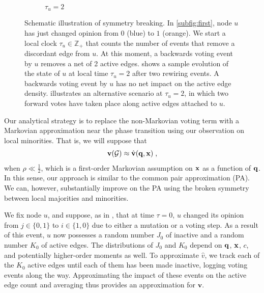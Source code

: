 \documentclass[review, onefignum, onetabnum]{siamart171218}
\begin{document}
\begin{figure}
\begin{subfigure}{.3\textwidth}
				\caption{$\tau_u = 2$}\label{subfig:third}
			\end{subfigure}
			\caption{
				Schematic illustration of symmetry breaking.
				In \cref{subfig:first},  node $u$ has just changed opinion from $0$ (blue) to $1$ (orange). 
				We start a local clock $\tau_u \in \mathbb{Z}_+$ that counts the number of events that remove a discordant edge from $u$. 
				At this moment, a backwards voting event by $u$ removes a net of 2 active edges.  
				 shows a sample evolution of the state of $u$ at local time $\tau_u = 2$ after two rewiring events. 
				A backwards voting event by $u$ has no net impact on the active edge density. 
				 illustrates an alternative scenario at $\tau_u = 2$, in which two forward votes have taken place along active edges attached to $u$. 
				}\label{fig:breaking_illustration}
		\end{figure}
	
		Our analytical strategy is to replace the non-Markovian voting term with a Markovian approximation near the phase transition using our observation on local minorities. 
		That is, we will suppose that 
		\begin{align}
			\mathbf{v}(\mathcal{G}) \approx \hat{\mathbf{v}}(\q, \x)\;, \label{eq:markov}
		\end{align}
		when $\rho \ll \frac{1}{2}$, which is a first-order Markovian assumption on $\mathbf{x}$ as a function of $\mathbf{q}$. 
		In this sense, our approach is similar to the common pair approximation (PA). 
		We can, however, substantially improve on the PA using the broken symmetry between local majorities and minorities. 

		We fix node $u$, and suppose, as in , that at time $\tau = 0$, $u$ changed its opinion from $j \in \{0,1\}$ to $i \in \{1,0\}$ due to either a mutation or a voting step. 
		As a result of this event, $u$ now possesses a  random number $J_0$ of inactive and a random number $K_0$ of active edges. 
		The distributions of $J_0$ and $K_0$ depend on $\mathbf{q}$, $\mathbf{x}$, $c$, and potentially higher-order moments as well. 
		To approximate $\hat{v}$, we track each of the $K_0$ active edges until each of them has been made inactive, logging voting events along the way.
		Approximating the impact of these events on the active edge count and averaging thus provides an  approximation for $\mathbf{v}$.
		
\end{document}

